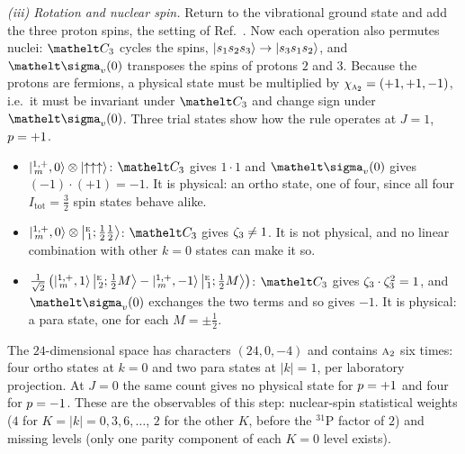 \emph{(iii) Rotation and nuclear spin.} Return to the vibrational ground state and add the three proton spins, the setting of Ref.~\cite{albert2025quantumtheorymolecularorientations}. Now each operation also permutes nuclei: $\elt{C_{3}}$ cycles the spins, $\ket{s_1s_2s_3}\to\ket{s_3s_1s_2}$, and $\elt{\sigma_{v}}(0)$ transposes the spins of protons $2$ and $3$. Because the protons are fermions, a physical state must be multiplied by $\chi_{\text{\normalfont\scshape a}_{2}}=(+1,+1,-1)$, i.e.\ it must be invariant under $\elt{C_{3}}$ and change sign under $\elt{\sigma_{v}}(0)$. Three trial states show how the rule operates at $J=1$, $p=+1$.
\begin{itemize}
\item $\ket{{}^{1,+}_{\,m},0}\otimes\ket{\uparrow\uparrow\uparrow}$: $\elt{C_{3}}$ gives $1\cdot1$ and $\elt{\sigma_{v}}(0)$ gives $(-1)\cdot(+1)=-1$. It is physical: an ortho state, one of four, since all four $I_{\mathrm{tot}}=\tfrac32$ spin states behave alike.
\item $\ket{{}^{1,+}_{\,m},0}\otimes\bigl\lvert{}^{\text{\normalfont\scshape e}}_{\,1};\tfrac12\tfrac12\bigr\rangle$: $\elt{C_{3}}$ gives $\zeta_{3}\neq1$. It is not physical, and no linear combination with other $k=0$ states can make it so.
\item $\tfrac{1}{\sqrt{2}}\,\bigl(\ket{{}^{1,+}_{\,m},1}\bigl\lvert{}^{\text{\normalfont\scshape e}}_{\,2};\tfrac12M\bigr\rangle-\ket{{}^{1,+}_{\,m},{-1}}\bigl\lvert{}^{\text{\normalfont\scshape e}}_{\,1};\tfrac12M\bigr\rangle\bigr)$: $\elt{C_{3}}$ gives $\zeta_{3}\cdot\zeta_{3}^{2}=1$, and $\elt{\sigma_{v}}(0)$ exchanges the two terms and so gives $-1$. It is physical: a para state, one for each $M=\pm\tfrac12$.
\end{itemize}
The $24$-dimensional space has characters $(24,0,-4)$ and contains $\text{\normalfont\scshape a}_{2}$ six times: four ortho states at $k=0$ and two para states at $|k|=1$, per laboratory projection. At $J=0$ the same count gives no physical state for $p=+1$ and four for $p=-1$. These are the observables of this step: nuclear-spin statistical weights ($4$ for $K=|k|=0,3,6,\ldots$, $2$ for the other $K$, before the $^{31}$P factor of $2$) and missing levels (only one parity component of each $K=0$ level exists).

